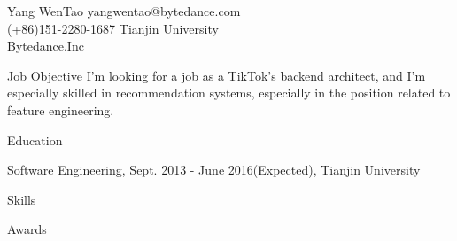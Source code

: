 \documentclass[letter,12pt]{article}
\begin{document}
\header
{Yang WenTao}
{yangwentao@bytedance.com \\ (+86)151-2280-1687}
{Tianjin University\\
Bytedance.Inc}


\begin{statementblock}{Job Objective}
	I'm looking for a job as a TikTok's backend architect, and I'm especially skilled in recommendation systems, especially in the position related to feature engineering.
\bigskip
\end{statementblock}


\begin{resumeblock}{Education}

{{Software Engineering}, Sept. 2013 - June 2016(Expected), {Tianjin University}
}

\end{resumeblock}


\begin{resumeblock}{Skills}
 



\end{resumeblock}


\begin{resumeblock}{Awards}




\end{resumeblock}

\end{document}

